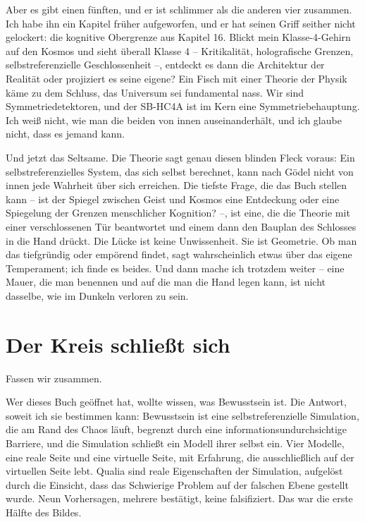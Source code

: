 \documentclass[11pt, twoside, openright]{book}
\begin{document}
Aber es gibt einen fünften, und er ist schlimmer als die anderen vier zusammen. Ich habe ihn ein Kapitel früher aufgeworfen, und er hat seinen Griff seither nicht gelockert: die kognitive Obergrenze aus Kapitel 16. Blickt mein Klasse-4-Gehirn auf den Kosmos und sieht überall Klasse 4 -- Kritikalität, holografische Grenzen, selbstreferenzielle Geschlossenheit --, entdeckt es dann die Architektur der Realität oder projiziert es seine eigene? Ein Fisch mit einer Theorie der Physik käme zu dem Schluss, das Universum sei fundamental nass. Wir sind Symmetriedetektoren, und der SB-HC4A ist im Kern eine Symmetriebehauptung. Ich weiß nicht, wie man die beiden von innen auseinanderhält, und ich glaube nicht, dass es jemand kann.

Und jetzt das Seltsame. Die Theorie sagt genau diesen blinden Fleck voraus: Ein selbstreferenzielles System, das sich selbst berechnet, kann nach Gödel nicht von innen jede Wahrheit über sich erreichen. Die tiefste Frage, die das Buch stellen kann -- ist der Spiegel zwischen Geist und Kosmos eine Entdeckung oder eine Spiegelung der Grenzen menschlicher Kognition? --, ist eine, die die Theorie mit einer verschlossenen Tür beantwortet und einem dann den Bauplan des Schlosses in die Hand drückt. Die Lücke ist keine Unwissenheit. Sie ist Geometrie. Ob man das tiefgründig oder empörend findet, sagt wahrscheinlich etwas über das eigene Temperament; ich finde es beides. Und dann mache ich trotzdem weiter -- eine Mauer, die man benennen und auf die man die Hand legen kann, ist nicht dasselbe, wie im Dunkeln verloren zu sein.

\section*{Der Kreis schließt sich}

Fassen wir zusammen.

Wer dieses Buch geöffnet hat, wollte wissen, was Bewusstsein ist. Die Antwort, soweit ich sie bestimmen kann: Bewusstsein ist eine selbstreferenzielle Simulation, die am Rand des Chaos läuft, begrenzt durch eine informationsundurchsichtige Barriere, und die Simulation schließt ein Modell ihrer selbst ein. Vier Modelle, eine reale Seite und eine virtuelle Seite, mit Erfahrung, die ausschließlich auf der virtuellen Seite lebt. Qualia sind reale Eigenschaften der Simulation, aufgelöst durch die Einsicht, dass das Schwierige Problem auf der falschen Ebene gestellt wurde. Neun Vorhersagen, mehrere bestätigt, keine falsifiziert. Das war die erste Hälfte des Bildes.
\end{document}
